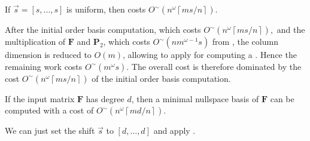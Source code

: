 \begin{lem}
\label{lem:costOfMinimalNullspaceBasisWithUniformShift}If $\vec{s}=\left[s,\dots,s\right]$
is uniform, then  costs $O^{\sim}\left(n^{\omega}\left\lceil ms/n\right\rceil \right)$. \end{lem}
\begin{pf}
After the initial order basis computation, which costs $O^{\sim}\left(n^{\omega}\left\lceil ms/n\right\rceil \right),$
and the multiplication of $\mathbf{F}$ and $\mathbf{P}_{2}$, which
costs $O^{\sim}\left(nm^{\omega-1}s\right)$ from ,
the column dimension is reduced to $O\left(m\right)$, allowing 
to apply for computing a . Hence the remaining work costs $O^{\sim}\left(m^{\omega}s\right)$.
The overall cost is therefore dominated by the cost $O^{\sim}\left(n^{\omega}\left\lceil ms/n\right\rceil \right)$
of the initial order basis computation.\end{pf}
\begin{cor}
\label{cor:costOfMinimalNullspaceBasis}If the input matrix $\mathbf{F}$
has degree $d$, then a minimal nullspace basis of $\mathbf{F}$ can
be computed with a cost of $O^{\sim}\left(n^{\omega}\left\lceil md/n\right\rceil \right)$. \end{cor}
\begin{pf}
We can just set the shift $\vec{s}$ to $\left[d,\dots,d\right]$
and apply .\end{pf}

